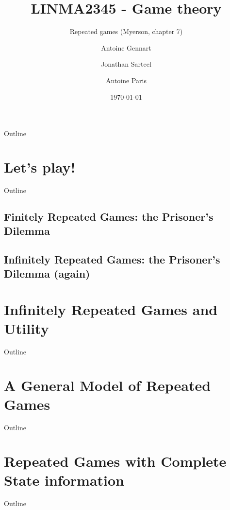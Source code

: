 \documentclass[10pt]{beamer}
\title{LINMA2345 - Game theory}
\subtitle{Repeated games (Myerson, chapter 7)}
\date{\today}
\author{Antoine Gennart\and Jonathan Sarteel\and Antoine Paris}
\institute{Ecole polytechnique de Louvain}
\begin{document}
\maketitle


\begin{frame}{Outline}
    \tableofcontents
\end{frame}

\section{Let's play!}
\begin{frame}{Outline}
    \tableofcontents[currentsection]
\end{frame}

\subsection{Finitely Repeated Games: the Prisoner's Dilemma}


\subsection{Infinitely Repeated Games: the Prisoner's Dilemma (again)}



\section{Infinitely Repeated Games and Utility}
\begin{frame}{Outline}
    \tableofcontents[currentsection]
\end{frame}



\section{A General Model of Repeated Games}
\begin{frame}{Outline}
    \tableofcontents[currentsection]
\end{frame}



\section{Repeated Games with Complete State information}
\begin{frame}{Outline}
    \tableofcontents[currentsection]
\end{frame}
\end{document}
